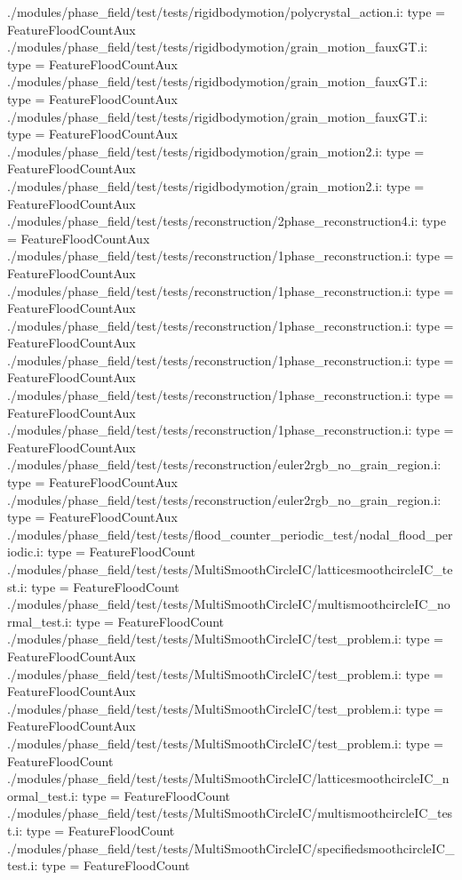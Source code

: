 ./modules/phase_field/test/tests/rigidbodymotion/polycrystal_action.i:    type = FeatureFloodCountAux
./modules/phase_field/test/tests/rigidbodymotion/grain_motion_fauxGT.i:    type = FeatureFloodCountAux
./modules/phase_field/test/tests/rigidbodymotion/grain_motion_fauxGT.i:    type = FeatureFloodCountAux
./modules/phase_field/test/tests/rigidbodymotion/grain_motion_fauxGT.i:    type = FeatureFloodCountAux
./modules/phase_field/test/tests/rigidbodymotion/grain_motion2.i:    type = FeatureFloodCountAux
./modules/phase_field/test/tests/rigidbodymotion/grain_motion2.i:    type = FeatureFloodCountAux
./modules/phase_field/test/tests/reconstruction/2phase_reconstruction4.i:    type = FeatureFloodCountAux
./modules/phase_field/test/tests/reconstruction/1phase_reconstruction.i:    type = FeatureFloodCountAux
./modules/phase_field/test/tests/reconstruction/1phase_reconstruction.i:    type = FeatureFloodCountAux
./modules/phase_field/test/tests/reconstruction/1phase_reconstruction.i:    type = FeatureFloodCountAux
./modules/phase_field/test/tests/reconstruction/1phase_reconstruction.i:    type = FeatureFloodCountAux
./modules/phase_field/test/tests/reconstruction/1phase_reconstruction.i:    type = FeatureFloodCountAux
./modules/phase_field/test/tests/reconstruction/1phase_reconstruction.i:    type = FeatureFloodCountAux
./modules/phase_field/test/tests/reconstruction/euler2rgb_no_grain_region.i:    type = FeatureFloodCountAux
./modules/phase_field/test/tests/reconstruction/euler2rgb_no_grain_region.i:    type = FeatureFloodCountAux
./modules/phase_field/test/tests/flood_counter_periodic_test/nodal_flood_periodic.i:    type = FeatureFloodCount
./modules/phase_field/test/tests/MultiSmoothCircleIC/latticesmoothcircleIC_test.i:    type = FeatureFloodCount
./modules/phase_field/test/tests/MultiSmoothCircleIC/multismoothcircleIC_normal_test.i:    type = FeatureFloodCount
./modules/phase_field/test/tests/MultiSmoothCircleIC/test_problem.i:    type = FeatureFloodCountAux
./modules/phase_field/test/tests/MultiSmoothCircleIC/test_problem.i:    type = FeatureFloodCountAux
./modules/phase_field/test/tests/MultiSmoothCircleIC/test_problem.i:    type = FeatureFloodCountAux
./modules/phase_field/test/tests/MultiSmoothCircleIC/test_problem.i:    type = FeatureFloodCount
./modules/phase_field/test/tests/MultiSmoothCircleIC/latticesmoothcircleIC_normal_test.i:    type = FeatureFloodCount
./modules/phase_field/test/tests/MultiSmoothCircleIC/multismoothcircleIC_test.i:    type = FeatureFloodCount
./modules/phase_field/test/tests/MultiSmoothCircleIC/specifiedsmoothcircleIC_test.i:    type = FeatureFloodCount
